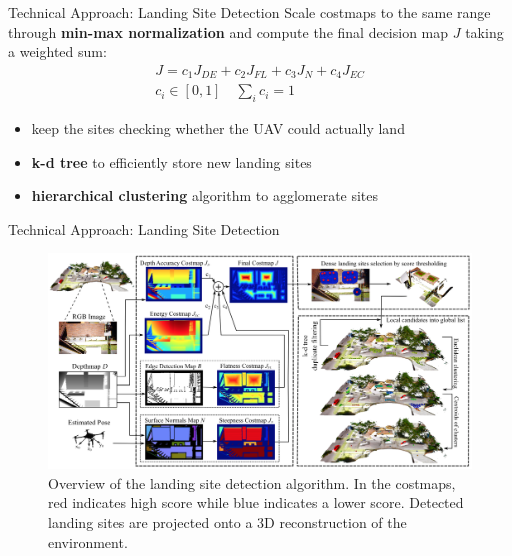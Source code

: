 \documentclass[10pt]{beamer}
\begin{document}
    \begin{frame}{Technical Approach: Landing Site Detection}
        \justifying
        Scale costmaps to the same range through \textbf{min-max normalization}
        and compute the final decision map $J$ taking a weighted sum:
        \begin{gather*}
            J = c_1 J_{DE} + c_2 J_{FL} + c_3 J_{N} + c_4 J_{EC} \\
            c_i \in [0, 1] \quad \sum_i c_i = 1
        \end{gather*}
        \vspace{-0.5cm}
        \begin{itemize}
            \item keep the sites checking whether the UAV could actually land
            \item \textbf{k-d tree} to efficiently store new landing sites
            \item \textbf{hierarchical clustering} algorithm to agglomerate sites
        \end{itemize}
    \end{frame}

    \begin{frame}{Technical Approach: Landing Site Detection}
        \begin{figure}
            \caption{
                \justifying
                Overview of the landing site detection algorithm. In
                the costmaps, red indicates high score while blue indicates
                a lower score. Detected landing sites are projected onto
                a 3D reconstruction of the environment.}
            \vspace{-0.3cm}
            \includegraphics[width=\textwidth]{images/Fig3.png}
        \end{figure}
    \end{frame}
\end{document}
